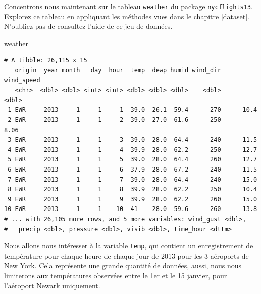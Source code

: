 \documentclass[a4paperpaper,]{article}
\newenvironment{Shaded}{\begin{snugshade}}{\end{snugshade}}
\newcommand{\DecValTok}[1]{\textcolor[rgb]{0.69,0.50,0.00}{#1}}
\newcommand{\KeywordTok}[1]{\textcolor[rgb]{0.12,0.11,0.11}{\textbf{#1}}}
\newcommand{\NormalTok}[1]{\textcolor[rgb]{0.12,0.11,0.11}{#1}}
\newcommand{\OperatorTok}[1]{\textcolor[rgb]{0.12,0.11,0.11}{#1}}
\newcommand{\StringTok}[1]{\textcolor[rgb]{0.75,0.01,0.01}{#1}}
\theoremstyle{definition}
\theoremstyle{definition}
\theoremstyle{definition}
\theoremstyle{remark}
\begin{document}
Concentrons nous maintenant sur le tableau \texttt{weather} du package
\texttt{nycflights13}. Explorez ce tableau en appliquant les méthodes
vues dans le chapitre \ref{dataset}. N'oubliez pas de consultez l'aide
de ce jeu de données.

\begin{Shaded}
\begin{Highlighting}[]
\NormalTok{weather}
\end{Highlighting}
\end{Shaded}

\begin{verbatim}
# A tibble: 26,115 x 15
   origin  year month   day  hour  temp  dewp humid wind_dir wind_speed
   <chr>  <dbl> <dbl> <int> <int> <dbl> <dbl> <dbl>    <dbl>      <dbl>
 1 EWR     2013     1     1     1  39.0  26.1  59.4      270      10.4 
 2 EWR     2013     1     1     2  39.0  27.0  61.6      250       8.06
 3 EWR     2013     1     1     3  39.0  28.0  64.4      240      11.5 
 4 EWR     2013     1     1     4  39.9  28.0  62.2      250      12.7 
 5 EWR     2013     1     1     5  39.0  28.0  64.4      260      12.7 
 6 EWR     2013     1     1     6  37.9  28.0  67.2      240      11.5 
 7 EWR     2013     1     1     7  39.0  28.0  64.4      240      15.0 
 8 EWR     2013     1     1     8  39.9  28.0  62.2      250      10.4 
 9 EWR     2013     1     1     9  39.9  28.0  62.2      260      15.0 
10 EWR     2013     1     1    10  41    28.0  59.6      260      13.8 
# ... with 26,105 more rows, and 5 more variables: wind_gust <dbl>,
#   precip <dbl>, pressure <dbl>, visib <dbl>, time_hour <dttm>
\end{verbatim}

Nous allons nous intéresser à la variable \texttt{temp}, qui contient un
enregistrement de température pour chaque heure de chaque jour de 2013
pour les 3 aéroports de New York. Cela représente une grande quantité de
données, aussi, nous nous limiterons aux températures observées entre le
1er et le 15 janvier, pour l'aéroport Newark uniquement.

\begin{Shaded}
\end{Shaded}
\end{document}
